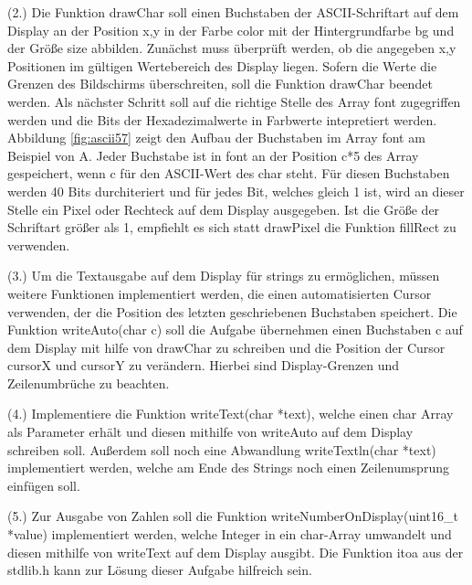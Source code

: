 (2.) Die Funktion drawChar soll einen Buchstaben der ASCII-Schriftart auf dem Display an der Position x,y in der Farbe color mit der Hintergrundfarbe bg und der Größe size abbilden. Zunächst muss überprüft werden, ob die angegeben x,y Positionen im gültigen Wertebereich des Display liegen. Sofern die Werte die Grenzen des Bildschirms überschreiten, soll die Funktion drawChar beendet werden. Als nächster Schritt soll auf die richtige Stelle des Array font zugegriffen werden und die Bits der Hexadezimalwerte in Farbwerte intepretiert werden. Abbildung \ref{fig:ascii57} zeigt den Aufbau der Buchstaben im Array font am Beispiel von A. Jeder Buchstabe ist in font an der Position c*5 des Array gespeichert, wenn c für den ASCII-Wert des char steht. Für diesen Buchstaben werden 40 Bits durchiteriert und für jedes Bit, welches gleich 1 ist, wird an dieser Stelle ein Pixel oder Rechteck auf dem Display ausgegeben. Ist die Größe der Schriftart größer als 1, empfiehlt es sich statt drawPixel die Funktion fillRect zu verwenden. 

(3.) Um die Textausgabe auf dem Display für strings zu ermöglichen, müssen weitere Funktionen implementiert werden, die einen automatisierten Cursor verwenden, der die Position des letzten geschriebenen Buchstaben speichert. Die Funktion writeAuto(char c) soll die Aufgabe übernehmen einen Buchstaben c auf dem Display mit hilfe von drawChar zu schreiben und die Position der Cursor cursorX und cursorY zu verändern. Hierbei sind Display-Grenzen und Zeilenumbrüche zu beachten.

(4.) Implementiere die Funktion writeText(char *text), welche einen char Array als Parameter erhält und diesen mithilfe von writeAuto auf dem Display schreiben soll. Außerdem soll noch eine Abwandlung writeTextln(char *text) implementiert werden, welche am Ende des Strings noch einen Zeilenumsprung einfügen soll.

(5.) Zur Ausgabe von Zahlen soll die Funktion writeNumberOnDisplay(uint16\_t *value) implementiert werden, welche Integer in ein char-Array umwandelt und diesen mithilfe von writeText auf dem Display ausgibt. Die Funktion itoa aus der stdlib.h kann zur Lösung dieser Aufgabe hilfreich sein.

